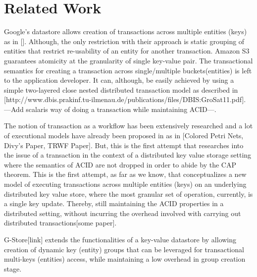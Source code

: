 \section{Related Work} \label{sec:relwork}

Google's datastore allows creation of transactions across multiple
entities (keys) as in []. Although, the only restriction with their
approach is static grouping of entities that restrict re-usability of an entity for another
transaction. Amazon S3 guarantees atomicity at the granularity of single
key-value pair. The transactional semantics for creating a transaction across
single/multiple buckets(entities) is left to the application developer. It can,
although, be easily achieved by using a simple two-layered close nested
distributed transaction model as described in [http://www.dbis.prakinf.tu-ilmenau.de/publications/files/DBIS:GroSat11.pdf].
---Add scalaris way of doing a transaction while maintaining ACID---.

The notion of transaction as a workflow has been extensively researched and a
lot of executional models have already been proposed in
as in [Colored Petri Nets, Divy's Paper, TRWF Paper]. But, this is the first
attempt that researches into the issue of a transaction in the context of a
distributed key value storage setting where the semantics of ACID are not
dropped in order to abide by the CAP theorem. This is the first attempt, as far as we know,
that conceptualizes a new model of executing transactions across multiple
entities (keys) on an underlying distributed key value store, where the most
granular set of operation, currently, is a single key update. Thereby, still maintaining
the ACID properties in a distributed setting, without incurring the overhead involved
with carrying out distributed transactions[some paper].

G-Store[link] extends the functionalities of a key-value datastore by allowing
creation of dynamic key (entity) groups that can be leveraged for transactional
multi-keys (entities) access, while maintaining a low overhead in group
creation stage. 
